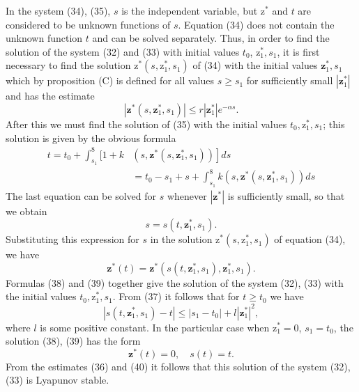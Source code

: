 \documentclass[10pt,a5paper]{book}
\makeatletter
\theoremstyle{plain}
\theoremstyle{definition}
\theoremstyle{remark}
\renewenvironment{proof}[1][\proofname]{\par
  \pushQED{\qed}%
  \normalfont\topsep6\p@\@plus6\p@\relax
  \trivlist
  \item\relax{\itshape #1\@addpunct{.}}\hspace\labelsep\ignorespaces
}{\popQED\endtrivlist\@endpefalse}
\makeatother
\begin{document}
\begin{proof}[Proof of Theorem 26]
In the system (34), (35), $s$ is the independent variable, but $\mathrm{z}^{*}$ and $t$ are considered to be unknown functions of $s$. Equation (34) does not contain the unknown function $t$ and can be solved separately. Thus, in order to find the solution of the system (32) and (33) with initial values $t_{0}$, $\mathrm{z}_{1}^{*}, s_{1}$, it is first necessary to find the solution $\mathrm{z}^{*}\left(s, \mathrm{z}_{1}^{*}, s_{1}\right)$ of (34) with the initial values $\mathbf{z}_{1}^{*}, s_{1}$ which by proposition (C) is defined for all values $s \geq s_{1}$ for sufficiently small $\left|\mathbf{z}_{1}^{*}\right|$ and has the estimate
\begin{equation*}
\left|\mathbf{z}^{*}\left(s, \mathbf{z}_{1}^{*}, s_{1}\right)\right| \leq r\left|\mathbf{z}_{1}^{*}\right| e^{-\alpha s} . \tag{36}
\end{equation*}
After this we must find the solution of (35) with the initial values $t_{0}, \mathrm{z}_{1}^{*}, s_{1}$; this solution is given by the obvious formula
\begin{align*}
t=t_{0}+\int_{s_{1}}^{8}[1+k & \left.\left(s, \mathbf{z}^{*}\left(s, \mathbf{z}_{1}^{*}, s_{1}\right)\right)\right] d s \\
& =t_{0}-s_{1}+s+\int_{s_{1}}^{8} k\left(s, \mathbf{z}^{*}\left(s, \mathbf{z}_{1}^{*}, s_{1}\right)\right) d s \tag{37}
\end{align*}
The last equation can be solved for $s$ whenever $\left|\mathbf{z}^{*}\right|$ is sufficiently small, so that we obtain
\begin{equation*}
s=s\left(t, \mathbf{z}_{1}^{*}, s_{1}\right) . \tag{38}
\end{equation*}
Substituting this expression for $s$ in the solution $\mathrm{z}^{*}\left(s, \mathrm{z}_{1}^{*}, s_{1}\right)$ of equation (34), we have
\begin{equation*}
\mathbf{z}^{*}(t)=\mathbf{z}^{*}\left(s\left(t, \mathbf{z}_{1}^{*}, s_{1}\right), \mathbf{z}_{1}^{*}, s_{1}\right) . \tag{39}
\end{equation*}
Formulas (38) and (39) together give the solution of the system (32), (33) with the initial values $t_{0}, \mathrm{z}_{1}^{*}, s_{1}$. From (37) it follows that for $t \geq t_{0}$ we have
\begin{equation*}
\left|s\left(t, \mathbf{z}_{1}^{*}, s_{1}\right)-t\right| \leq\left|s_{1}-t_{0}\right|+l\left|\mathbf{z}_{1}^{*}\right|^{2}, \tag{40}
\end{equation*}
where $l$ is some positive constant. In the particular case when $\mathrm{z}_{1}^{*}=0$, $s_{1}=t_{0}$, the solution (38), (39) has the form
\[
\mathbf{z}^{*}(t)=0, \quad s(t)=t .
\]
From the estimates (36) and (40) it follows that this solution of the system (32), (33) is Lyapunov stable.


\end{proof}
\end{document}

